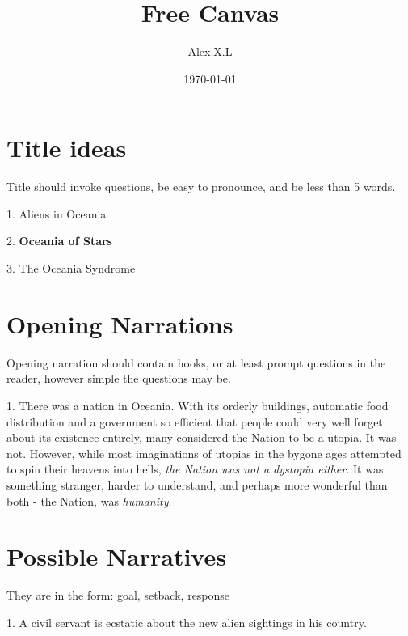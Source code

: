 \documentclass[11pt]{article}
\begin{document}
\begin{titlepage}
\title{Free Canvas}
\author{Alex.X.L}
\date{\today} %
\maketitle
\thispagestyle{empty} %
\end{titlepage}



\tableofcontents
\newpage %






\section{Title ideas}
Title should invoke questions, be easy to pronounce, and be less than 5 words. 

1. Aliens in Oceania

2. \textbf{Oceania of Stars}

3. The Oceania Syndrome

\section{Opening Narrations}
Opening narration should contain hooks, or at least prompt questions in the reader, however simple the questions may be.

1. There was a nation in Oceania. With its orderly buildings, automatic food distribution and a government so efficient that people could very well forget about its existence entirely, many considered the Nation to be a utopia. It was not. However, while most imaginations of utopias in the bygone ages attempted to spin their heavens into hells, \textit{the Nation was not a dystopia either.} It was something stranger, harder to understand, and perhaps more wonderful than both - the Nation, was \textit{humanity}. 


\section{Possible Narratives}
They are in the form: goal, setback, response

1. A civil servant is ecstatic about the new alien sightings in his country. 
\end{document}
